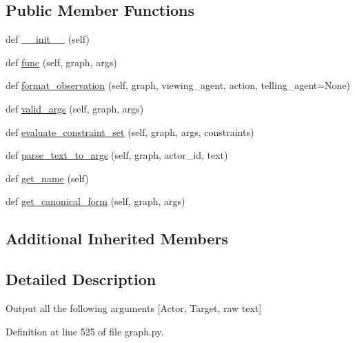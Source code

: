 \subsection*{Public Member Functions}
\begin{DoxyCompactItemize}
\item 
def \hyperlink{classlight__chats_1_1graph_1_1TellFunction_ab0442ec224b9e0a627806d5634be2926}{\+\_\+\+\_\+init\+\_\+\+\_\+} (self)
\item 
def \hyperlink{classlight__chats_1_1graph_1_1TellFunction_a91e865e9bbba1f3ed3f01445896be21d}{func} (self, graph, args)
\item 
def \hyperlink{classlight__chats_1_1graph_1_1TellFunction_ab4c8496d4fa9e03040b6090eaa65528a}{format\+\_\+observation} (self, graph, viewing\+\_\+agent, action, telling\+\_\+agent=None)
\item 
def \hyperlink{classlight__chats_1_1graph_1_1TellFunction_a86e8534217b3d10cb4daf5cc080d624e}{valid\+\_\+args} (self, graph, args)
\item 
def \hyperlink{classlight__chats_1_1graph_1_1TellFunction_ad70758fa554b68e7b2517704a7ab5e76}{evaluate\+\_\+constraint\+\_\+set} (self, graph, args, constraints)
\item 
def \hyperlink{classlight__chats_1_1graph_1_1TellFunction_a88ac4115a6cca664cd220fb0b8852629}{parse\+\_\+text\+\_\+to\+\_\+args} (self, graph, actor\+\_\+id, text)
\item 
def \hyperlink{classlight__chats_1_1graph_1_1TellFunction_a39a099e864d0d20f997c03d96d7e1df8}{get\+\_\+name} (self)
\item 
def \hyperlink{classlight__chats_1_1graph_1_1TellFunction_a1ce8fd5a8ee86a01e68e9115f8cc9108}{get\+\_\+canonical\+\_\+form} (self, graph, args)
\end{DoxyCompactItemize}
\subsection*{Additional Inherited Members}


\subsection{Detailed Description}
\begin{DoxyVerb}Output all the following arguments [Actor, Target, raw text]
\end{DoxyVerb}
 

Definition at line 525 of file graph.\+py.



